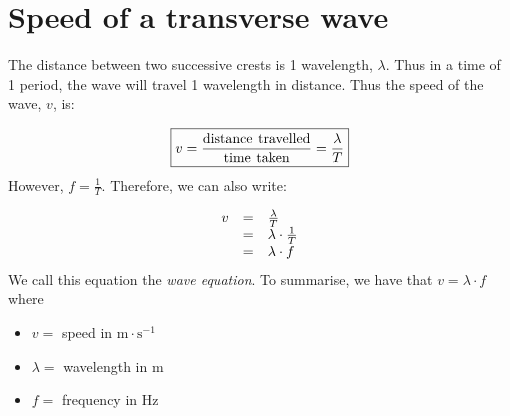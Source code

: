     \noindent
      \label{m38806*uid21}
            \section{Speed of a transverse wave}
            \nopagebreak
   
        \label{m38806*id319706}The distance between two successive crests is 1 wavelength, $\lambda $. Thus in a time of 1 period, the wave will travel 1 wavelength in distance. Thus the speed of the wave, $v$, is:\par 
        \label{m38806*id319732}\nopagebreak\noindent{}
    \begin{equation}\nonumber
    \boxed{v=\frac{\text{distance}\phantom{\rule{4.pt}{0ex}}\text{travelled}}{\text{time}\phantom{\rule{4.pt}{0ex}}\text{taken}}=\frac{\lambda }{T}}
      \end{equation}
        \label{m38806*id319776}However, $f=\frac{1}{T}$. Therefore, we can also write:\par 
        \label{m38806*id319802}\nopagebreak\noindent{}
          
    \begin{equation}\nonumber
    \begin{array}{ccc}\hfill v& =& \frac{\lambda }{T}\hfill \\ & =& \lambda \ensuremath{\cdot}\frac{1}{T}\hfill \\ & =& \lambda \ensuremath{\cdot}f\hfill \end{array}
      \end{equation}
        \label{m38806*id319870}We call this equation the \textsl{wave equation}. To summarise, we have that $v=\lambda \ensuremath{\cdot}f$ where\par 
        \label{m38806*id319901}\begin{itemize}[noitemsep]
            \label{m38806*uid22}\item $v=$ speed in $\text{m}\ensuremath{\cdot}\text{s}{}^{-1}$\label{m38806*uid23}\item $\lambda =$ wavelength in $\text{m}$
\label{m38806*uid24}\item $f=$ frequency in $\text{Hz}$
\end{itemize}


